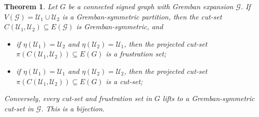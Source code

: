 \documentclass[reprint,onecolumn]{article}
\newtheorem{theorem}{Theorem}[section]
\newcommand{\1}{\mathbb{1}}
\newcommand{\0}{\mathbf{0}}
\begin{document}
\begin{theorem}\label{thm: cuts become cuts or frustration sets}
Let $G$ be a connected signed graph with Gremban expansion $\mathcal{G}$. If $V(\mathcal{G})=\mathcal{U}_1\cup\mathcal{U}_2$ is a Gremban-symmetric partition, then the cut-set $C(\mathcal{U}_1,\mathcal{U}_2)\subseteq E(\mathcal{G})$ is Gremban-symmetric, and
\begin{itemize}
    \item if $\eta(\mathcal{U}_1)=\mathcal{U}_2$ and $ \eta(\mathcal{U}_2)=\mathcal{U}_1$, then the projected cut-set $\pi(C(\mathcal{U}_1,\mathcal{U}_2))\subseteq E(G)$ is a frustration set;
    \item if $\eta(\mathcal{U}_1)=\mathcal{U}_1$ and $ \eta(\mathcal{U}_2)=\mathcal{U}_2$, then the projected cut-set $\pi(C(\mathcal{U}_1,\mathcal{U}_2))\subseteq E(G)$ is a cut-set;
\end{itemize}
Conversely, every cut-set and frustration set in $G$ lifts to a Gremban-symmetric cut-set in $\mathcal{G}$. This is a bijection.
\end{theorem}
\end{document}
